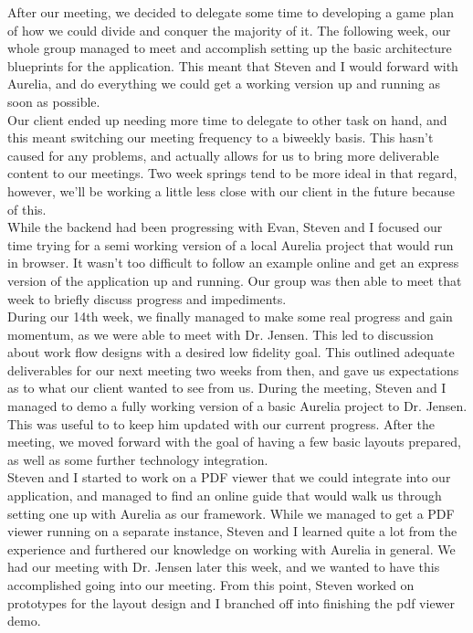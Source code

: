 \documentclass[onecolumn, draftclsnofoot,10pt, compsoc]{IEEEtran}
\begin{document}
\noindent After our meeting, we decided to delegate some time to developing a game plan of how we
could divide and conquer the majority of it. The following week, our whole group 
managed to meet and accomplish setting up the basic architecture blueprints for the 
application. This meant that Steven and I would forward with Aurelia, and do 
everything we could get a working version up and running as soon as possible.\\

\noindent Our client ended up needing more time to delegate to other task on hand, and this meant
switching our meeting frequency to a biweekly basis. This hasn't caused for any problems,
and actually allows for us to bring more deliverable content to our meetings. Two week
springs tend to be more ideal in that regard, however, we'll be working a little less
close with our client in the future because of this.\\

\noindent While the backend had been progressing with Evan, Steven and I focused our time 
trying for a semi working version of a local Aurelia project that would run in browser. 
It wasn't too difficult to follow an example online and get an express version of the 
application up and running. Our group was then able to meet that week to briefly discuss 
progress and impediments. \\

\noindent During our 14th week, we finally managed to make some real progress and gain momentum, as
we were able to meet with Dr. Jensen. This led to discussion about work flow designs with a
desired low fidelity goal. This outlined adequate deliverables for our next meeting two weeks
from then, and gave us expectations as to what our client wanted to see from us. During the meeting, 
Steven and I managed to demo a fully working version of a basic Aurelia project to Dr. Jensen. 
This was useful to to keep him updated with our current progress. After the meeting, we moved 
forward with the goal of having a few basic layouts prepared, as well
as some further technology integration.\\

\noindent Steven and I started to work on a PDF viewer that we could integrate into our application,
and managed to find an online guide that would walk us through setting one up with Aurelia
as our framework. While we managed to get a PDF viewer running on a separate instance, Steven
and I learned quite a lot from the experience and furthered our knowledge on working with
Aurelia in general. We had our meeting with Dr. Jensen later this week, and we wanted to have
this accomplished going into our meeting. From this point, Steven worked on prototypes for
the layout design and I branched off into finishing the pdf viewer demo. \\
\end{document}
